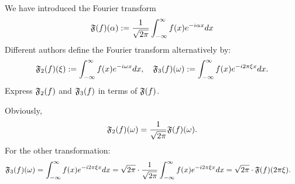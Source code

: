 \documentclass[11pt]{article}
\begin{document}
\begin{exercise}[Extra]
    We have introduced the Fourier transform 
    \begin{align*}
        \mathfrak{F}(f)(\alpha) := \frac{1}{\sqrt{2\pi}}\int_{-\infty}^{\infty} f(x) e^{-i \alpha x} dx
    \end{align*}
    Different authors define the Fourier transform alternatively by:
    \begin{align*}
        \mathfrak{F}_2(f)(\xi) 
        := \int_{-\infty}^{\infty} f(x) e^{-i \omega x} dx
        ,
        \quad 
        \mathfrak{F}_3(f)(\omega) 
        := \int_{-\infty}^{\infty} f(x) e^{-i 2\pi \xi x} dx
        .
    \end{align*}
    Express $\mathfrak{F}_{2}(f)$ and $\mathfrak{F}_{3}(f)$ in terms of $\mathfrak{F}(f)$.
\end{exercise}
\begin{solution}    
    Obviously, 
    \begin{align*}
        \mathfrak{F}_{2}(f)(\omega) = \frac{1}{\sqrt{2\pi}} \mathfrak{F}(f)(\omega).
    \end{align*}
    For the other transformation:
    \begin{align*}
        \mathfrak{F}_3(f)(\omega) 
        &
        = 
        \int_{-\infty}^{\infty} f(x) e^{-i 2\pi \xi x} dx
        = 
        \sqrt{2\pi} 
        \cdot 
        \frac{1}{\sqrt{2\pi}}
        \int_{-\infty}^{\infty} f(x) e^{-i 2\pi \xi x} dx
        = 
        \sqrt{2\pi} 
        \cdot 
        \mathfrak{F}(f)( 2\pi \xi )
        .
    \end{align*}
\end{solution}
\end{document}
